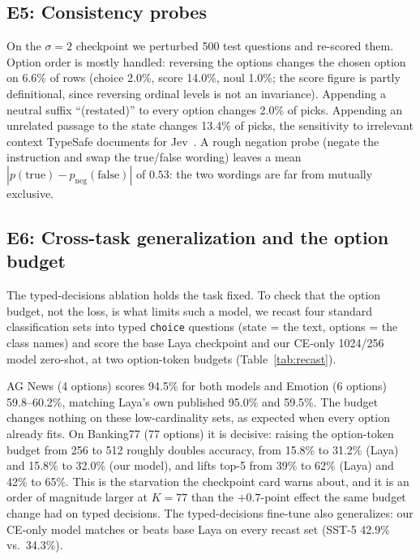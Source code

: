 \documentclass[conference]{IEEEtran}
\begin{document}
\subsection{E5: Consistency probes}
\label{sec:e5}

On the $\sigma{=}2$ checkpoint we perturbed 500 test questions and re-scored
them. Option order is mostly handled: reversing the options changes the chosen
option on 6.6\% of rows (choice 2.0\%, score 14.0\%, noul 1.0\%; the score
figure is partly definitional, since reversing ordinal levels is not an
invariance). Appending a neutral suffix ``(restated)'' to every option changes
2.0\% of picks. Appending an unrelated passage to the state changes 13.4\% of
picks, the sensitivity to irrelevant context TypeSafe documents for
Jev~\cite{typesafe_docs}. A rough negation probe (negate the instruction and
swap the true/false wording) leaves a mean
$|p(\text{true})-p_{\text{neg}}(\text{false})|$ of $0.53$: the two wordings are
far from mutually exclusive.

\subsection{E6: Cross-task generalization and the option budget}
\label{sec:e6}

The typed-decisions ablation holds the task fixed. To check that the option
budget, not the loss, is what limits such a model, we recast four standard
classification sets into typed \texttt{choice} questions (state = the text,
options = the class names) and score the base Laya checkpoint and our CE-only
1024/256 model zero-shot, at two option-token budgets (Table~\ref{tab:recast}).

AG News (4 options) scores 94.5\% for both models and Emotion (6 options)
59.8--60.2\%, matching Laya's own published 95.0\% and 59.5\%. The budget
changes nothing on these low-cardinality sets, as expected when every option
already fits. On Banking77 (77 options) it is decisive: raising the option-token
budget from 256 to 512 roughly doubles accuracy, from 15.8\% to 31.2\% (Laya)
and 15.8\% to 32.0\% (our model), and lifts top-5 from 39\% to 62\% (Laya) and
42\% to 65\%. This is the starvation the checkpoint card warns about, and it is
an order of magnitude larger at $K{=}77$ than the $+0.7$-point effect the same
budget change had on typed decisions. The typed-decisions fine-tune also
generalizes: our CE-only model matches or beats base Laya on every recast set
(SST-5 42.9\% vs.\ 34.3\%).
\end{document}

